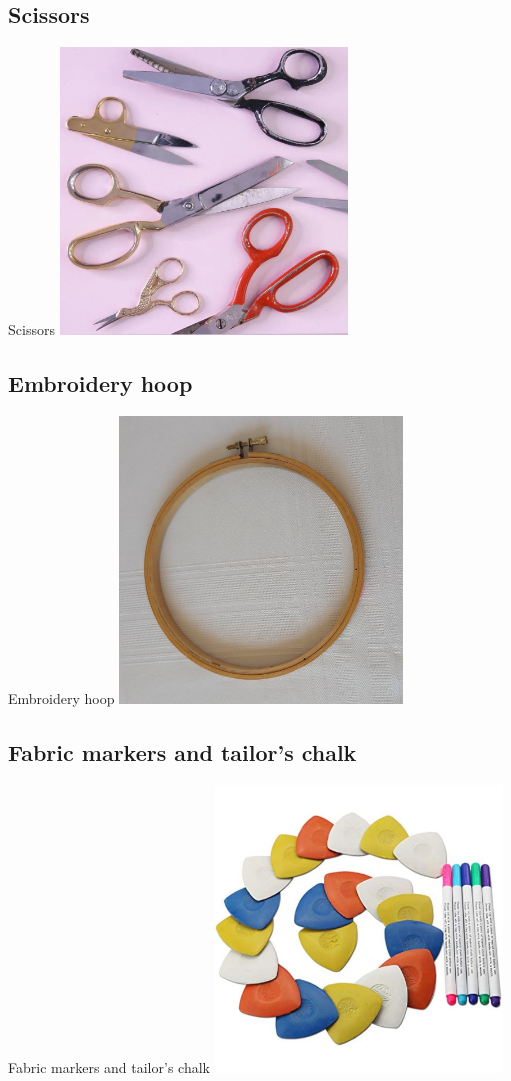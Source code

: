 \documentclass{beamer}
\begin{document}
\subsection{Scissors}
\begin{frame}[fragile]{Scissors}
\includegraphics[height=3in]{Scissors.jpg}
\end{frame}
\subsection{Embroidery hoop}
\begin{frame}[fragile]{Embroidery hoop}
\includegraphics[height=3in]{Embroideryhoop.jpg}
\end{frame}
\subsection{Fabric markers and tailor's chalk}
\begin{frame}[fragile]{Fabric markers and tailor's chalk}
\includegraphics[height=3in]{Fabricmarkerstailorschalk.jpg}
\end{frame}
\end{document}
